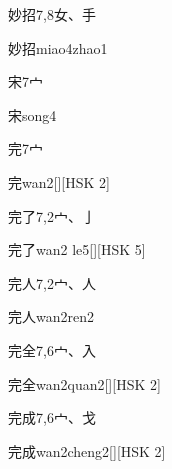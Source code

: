 \begin{entry}{妙招}{7,8}{⼥、⼿}
  \begin{phonetics}{妙招}{miao4zhao1}
  \end{phonetics}
\end{entry}

\begin{entry}{宋}{7}{⼧}
  \begin{phonetics}{宋}{song4}
  \end{phonetics}
\end{entry}

\begin{entry}{完}{7}{⼧}
  \begin{phonetics}{完}{wan2}[][HSK 2]
  \end{phonetics}
\end{entry}

\begin{entry}{完了}{7,2}{⼧、⼅}
  \begin{phonetics}{完了}{wan2 le5}[][HSK 5]
  \end{phonetics}
\end{entry}

\begin{entry}{完人}{7,2}{⼧、⼈}
  \begin{phonetics}{完人}{wan2ren2}
  \end{phonetics}
\end{entry}

\begin{entry}{完全}{7,6}{⼧、⼊}
  \begin{phonetics}{完全}{wan2quan2}[][HSK 2]
  \end{phonetics}
\end{entry}

\begin{entry}{完成}{7,6}{⼧、⼽}
  \begin{phonetics}{完成}{wan2cheng2}[][HSK 2]
  \end{phonetics}
\end{entry}

